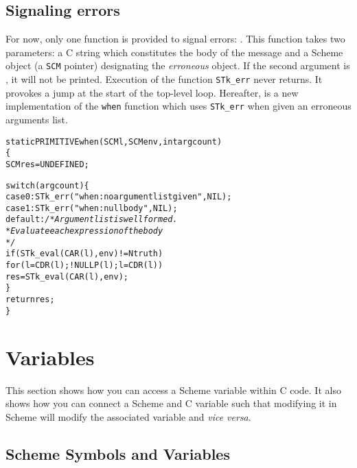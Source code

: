 \documentclass[10pt]{article}
\begin{document}
\subsection{Signaling errors}
For now, only one function is provided to signal errors: . This
function takes two parameters: a C string which constitutes the body of the
message and a Scheme object (a {\tt SCM} pointer) designating the {\em
erroneous} object.  If the second argument is , it will not be
printed. Execution of the function {\tt STk\_err} never returns.  It provokes a
jump at the start of the top-level loop. Hereafter, is a new implementation of
the {\tt when} function which uses {\tt STk\_err} when given an erroneous
arguments list.
\begin{Code}
\begin{alltt}
static PRIMITIVE when(SCM l, SCM env, int argcount)
\{
  SCM res = UNDEFINED;

  switch (argcount) \{
    case 0:  STk_err("when: no argument list given", NIL);
    case 1:  STk_err("when: null body", NIL);
    default: {\em /* Argument list is well formed.
              * Evaluate each expression of the body 
              */}
             if (STk_eval(CAR(l), env) != Ntruth)
               for (l = CDR(l); !NULLP(l); l = CDR(l)) 
                 res = STk_eval(CAR(l), env);
  \}
  return res;
\}
\end{alltt}
\end{Code}

\section{Variables}

This section shows how you can access a Scheme variable within C code. It also
shows how you can connect a Scheme and C variable such that modifying it in
Scheme will modify the associated variable and {\em vice versa}.

\subsection{Scheme Symbols and Variables}
\end{document}

